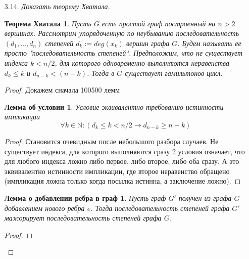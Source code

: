 \documentclass[10pt,a4paper]{article}
\begin{document}
\begin{enumerate}
\begin{enumerate}
	Затем аналогично отмечаем ребра, которые обязаны быть в графе в силу его регулярности. Легко заметить, что больше свободы выбора у нас нет - помечание ребра красным сразу влечет еще два синих (обязательных) ребра и так далее.\\
	Видим, что получился несвязный граф. Значит, в силу симметрии, связного эйлерова графа, полученного из графа Петерсона удалением ребер, не существует.
	\end{enumerate}
	\item[3.14.] \textit{Доказать теорему Хватала.}\\
	\newtheorem*{th1}{Теорема Хватала}
	\begin{th1}
	Пусть $G$ есть простой граф построенный на $n > 2$ вершинах. Рассмотрим упорядоченную по неубыванию последовательность $(d_1,\ldots,d_n)$ степеней $d_k:=deg(x_k)$ вершин графа $G$. Будем называть ее просто "последовательность степеней". Предположим, что не существует индекса $k < n/2$, для которого одновременно выполняются неравенства $d_k \leqslant k$ и $d_{n-k} < (n-k)$. Тогда в $G$ существует гамильтонов цикл.
	\end{th1}
	\begin{proof}
	Докажем сначала 100500 лемм
	
	\newtheorem*{lemma0}{Лемма об условии}
	\begin{lemma0}
	Условие эквивалентно требованию истинности импликации
	\[\forall k \in \mathbb N : (d_k \leq k < n/2 \rightarrow d_{n - k} \geq n - k)\]
	\end{lemma0}
	\begin{proof} 	
	Становится очевидным после небольшого разбора случаев. Не существует индекса, для которого выполняются сразу 2 условия означает, что для любого индекса ложно либо первое, либо второе, либо оба сразу. А это эквивалентно истинности импликации, где второе неравенство обращено (импликация ложна только когда посылка истинна, а заключение ложно).
	\qedhere
	\end{proof}
	
	\newtheorem*{lemma1}{Лемма о добавлении ребра в граф}
	\begin{lemma1}
	Пусть граф $G'$ получен из графа $G$ добавлением нового ребра $e$. Тогда последовательность степеней графа $G'$ мажорирует последовательность степеней графа $G$.
	\end{lemma1}
	\begin{proof}
	

\end{proof}
\end{proof}
\end{enumerate}
\end{document}
